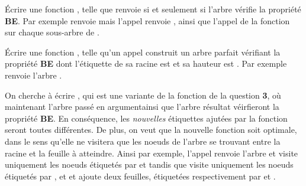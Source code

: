 \documentclass{report}
\begin{document}
\begin{exo}[Arbres]
\begin{q}{4}
\begin{enumerate}
        \end{enumerate}
        \begin{q}{4.1}
            Écrire une fonction , telle que
             renvoie  si et seulement si l'arbre
            vérifie la propriété \textbf{BE}. Par exemple 
            renvoie  mais l'appel  renvoie
            , ainsi que l'appel de la fonction  sur
            chaque sous-arbre de .
        \end{q}
        \begin{q}{4.2}
            Écrire une fonction ,
            telle qu'un appel  construit un arbre parfait
            vérifiant la propriété \textbf{BE} dont l'étiquette de sa racine est
             et sa hauteur est . Par exemple
             renvoie l'arbre .
        \end{q}
        \begin{q}{4.3}
            On cherche à écrire 
            , qui est une variante de la fonction  de la question
            \textbf{3}, où maintenant l'arbre passé en argumentainsi que l'arbre résultat
            véirfieront la propriété \textbf{BE}. En conséquence, les \textit{nouvelles}
            étiquettes ajutées par la fonction  seront toutes différentes.
            De plus, on veut que la nouvelle fonction soit optimale, dans le sens qu'elle ne visitera
            que les noeuds de l'arbre se trouvant entre la racine et la feuille à atteindre.
            Ainsi par exemple, l'appel  renvoie l'arbre
             et visite uniquement les noeuds étiquetés par  et
             tandis que  visite uniquement les noeuds
            étiquetés par ,  et  et ajoute deux
            feuilles, étiquetées respectivement par  et .
        \end{q}
    \end{q}
\end{exo}
\end{document}
